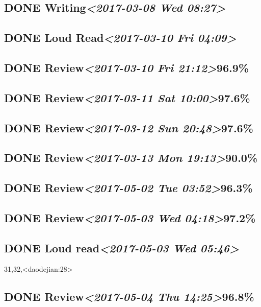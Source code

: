 \documentclass[11pt]{ctexart}
\begin{document}
\subsection{{\bfseries\sffamily DONE} Writing\textit{<2017-03-08 Wed 08:27>}}
\label{sec:orgfe67c6e}
\subsection{{\bfseries\sffamily DONE} Loud Read\textit{<2017-03-10 Fri 04:09>}}
\label{sec:orgee38b4e}
\subsection{{\bfseries\sffamily DONE} Review\textit{<2017-03-10 Fri 21:12>}96.9\%}
\label{sec:org248a1aa}
\subsection{{\bfseries\sffamily DONE} Review\textit{<2017-03-11 Sat 10:00>}97.6\%}
\label{sec:orgba55048}
\subsection{{\bfseries\sffamily DONE} Review\textit{<2017-03-12 Sun 20:48>}97.6\%}
\label{sec:orge13161d}
\subsection{{\bfseries\sffamily DONE} Review\textit{<2017-03-13 Mon 19:13>}90.0\%}
\label{sec:org041c960}
\subsection{{\bfseries\sffamily DONE} Review\textit{<2017-05-02 Tue 03:52>}96.3\%}
\label{sec:orgeebb8b7}
\subsection{{\bfseries\sffamily DONE} Review\textit{<2017-05-03 Wed 04:18>}97.2\%}
\label{sec:orgad27c0d}
\subsection{{\bfseries\sffamily DONE} Loud read\textit{<2017-05-03 Wed 05:46>}}
\label{sec:orgb7f7f33}
31,32,<daodejian:28>
\subsection{{\bfseries\sffamily DONE} Review\textit{<2017-05-04 Thu 14:25>}96.8\%}
\label{sec:org27b3c82}
\end{document}
